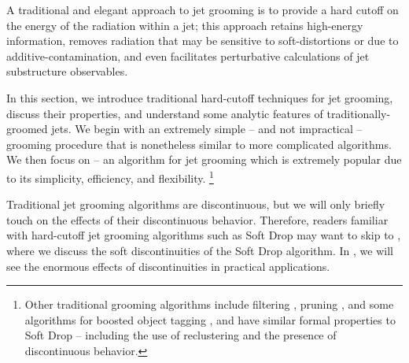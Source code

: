 

A traditional and elegant approach to jet grooming is to provide a hard cutoff on the energy of the radiation within a jet;
%
this approach retains high-energy information, removes radiation that may be sensitive to \glspl{soft-distortion} or due to \gls{additive-contamination}, and even facilitates perturbative calculations of jet substructure observables.


In this section, we introduce traditional hard-cutoff techniques for jet grooming, discuss their properties, and understand some analytic features of traditionally-groomed jets.
%
We begin with an extremely simple -- and not impractical -- grooming procedure that is nonetheless similar to more complicated algorithms.
%
We then focus on  -- an algorithm for jet grooming which is extremely popular due to its simplicity, efficiency, and flexibility.%
\footnote{
    Other traditional grooming algorithms include filtering \cite{}, pruning \cite{}, and some algorithms for boosted object tagging \cite{}, and have similar formal properties to Soft Drop -- including the use of reclustering and the presence of discontinuous behavior.
}

Traditional jet grooming algorithms are discontinuous, but we will only briefly touch on the effects of their discontinuous behavior.
%
Therefore, readers familiar with hard-cutoff jet grooming algorithms such as Soft Drop may want to skip to , where we discuss the soft discontinuities of the Soft Drop algorithm.
%
In , we will see the enormous effects of discontinuities in practical applications.


